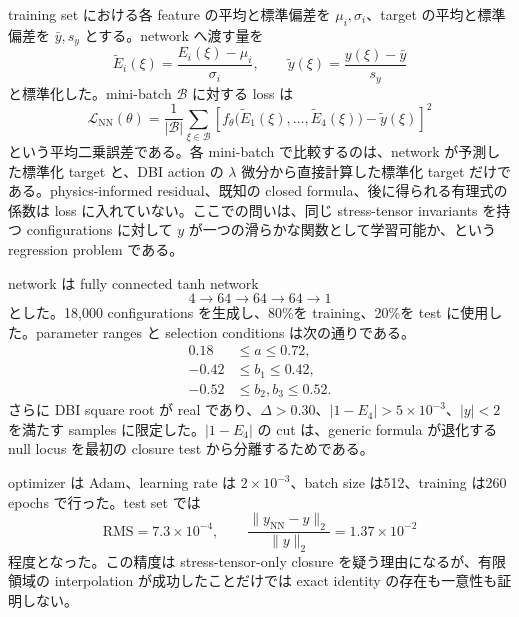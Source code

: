 \documentclass[a4paper,11pt]{ltjsreport}
\begin{document}
training set における各 feature の平均と標準偏差を $\mu_i,\sigma_i$、target の平均と標準偏差を $\bar y,s_y$ とする。network へ渡す量を
\begin{equation}
 \widetilde E_i(\xi)=\frac{E_i(\xi)-\mu_i}{\sigma_i},
 \qquad
 \widetilde y(\xi)=\frac{y(\xi)-\bar y}{s_y}
 \label{eq:nn-standardize}
\end{equation}
と標準化した。mini-batch $\mathcal B$ に対する loss は
\begin{equation}
 \mathcal L_{\mathrm{NN}}(\theta)
 =\frac{1}{|\mathcal B|}\sum_{\xi\in\mathcal B}
 \left[
 f_\theta\bigl(\widetilde E_1(\xi),\ldots,\widetilde E_4(\xi)\bigr)
 -\widetilde y(\xi)
 \right]^2
 \label{eq:nn-loss}
\end{equation}
という平均二乗誤差である。各 mini-batch で比較するのは、network が予測した標準化 target と、DBI action の $\lambda$ 微分から直接計算した標準化 target だけである。physics-informed residual、既知の closed formula、後に得られる有理式の係数は loss に入れていない。ここでの問いは、同じ stress-tensor invariants を持つ configurations に対して $y$ が一つの滑らかな関数として学習可能か、という regression problem である。

network は fully connected tanh network
\begin{equation}
 4\longrightarrow64\longrightarrow64\longrightarrow64\longrightarrow1
 \label{eq:nn-architecture}
\end{equation}
とした。18,000 configurations を生成し、80\%を training、20\%を test に使用した。parameter ranges と selection conditions は次の通りである。
\begin{align}
 0.18&\le a\le0.72,\nonumber\\
 -0.42&\le b_1\le0.42,\nonumber\\
 -0.52&\le b_2,b_3\le0.52.
\end{align}
さらに DBI square root が real であり、$\Delta>0.30$、$|1-E_4|>5\times10^{-3}$、$|y|<2$ を満たす samples に限定した。$|1-E_4|$ の cut は、generic formula が退化する null locus を最初の closure test から分離するためである。

optimizer は Adam、learning rate は $2\times10^{-3}$、batch size は512、training は260 epochs で行った。test set では
\begin{equation}
 \mathrm{RMS}=7.3\times10^{-4},
 \qquad
 \frac{\|y_{\mathrm{NN}}-y\|_2}{\|y\|_2}=1.37\times10^{-2}
\end{equation}
程度となった。この精度は stress-tensor-only closure を疑う理由になるが、有限領域の interpolation が成功したことだけでは exact identity の存在も一意性も証明しない。
\end{document}
